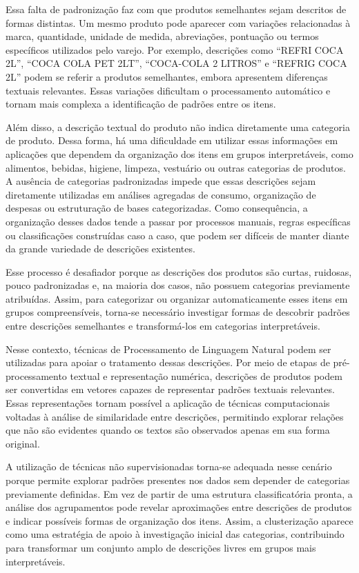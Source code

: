 \documentclass[english,brazilian]{UNISINOSmonografia}
\begin{document}
Essa falta de padronização faz com que produtos semelhantes sejam descritos de formas distintas. Um mesmo produto pode aparecer com variações relacionadas à marca, quantidade, unidade de medida, abreviações, pontuação ou termos específicos utilizados pelo varejo. Por exemplo, descrições como ``REFRI COCA 2L'', ``COCA COLA PET 2LT'', ``COCA-COLA 2 LITROS'' e ``REFRIG COCA 2L'' podem se referir a produtos semelhantes, embora apresentem diferenças textuais relevantes. Essas variações dificultam o processamento automático e tornam mais complexa a identificação de padrões entre os itens.

Além disso, a descrição textual do produto não indica diretamente uma categoria de produto. Dessa forma, há uma dificuldade em utilizar essas informações em aplicações que dependem da organização dos itens em grupos interpretáveis, como alimentos, bebidas, higiene, limpeza, vestuário ou outras categorias de produtos. A ausência de categorias padronizadas impede que essas descrições sejam diretamente utilizadas em análises agregadas de consumo, organização de despesas ou estruturação de bases categorizadas. Como consequência, a organização desses dados tende a passar por processos manuais, regras específicas ou classificações construídas caso a caso, que podem ser difíceis de manter diante da grande variedade de descrições existentes.

Esse processo é desafiador porque as descrições dos produtos são curtas, ruidosas, pouco padronizadas e, na maioria dos casos, não possuem categorias previamente atribuídas. Assim, para categorizar ou organizar automaticamente esses itens em grupos compreensíveis, torna-se necessário investigar formas de descobrir padrões entre descrições semelhantes e transformá-los em categorias interpretáveis.

Nesse contexto, técnicas de Processamento de Linguagem Natural podem ser utilizadas para apoiar o tratamento dessas descrições. Por meio de etapas de pré-processamento textual e representação numérica, descrições de produtos podem ser convertidas em vetores capazes de representar padrões textuais relevantes. Essas representações tornam possível a aplicação de técnicas computacionais voltadas à análise de similaridade entre descrições, permitindo explorar relações que não são evidentes quando os textos são observados apenas em sua forma original.

A utilização de técnicas não supervisionadas torna-se adequada nesse cenário porque permite explorar padrões presentes nos dados sem depender de categorias previamente definidas. Em vez de partir de uma estrutura classificatória pronta, a análise dos agrupamentos pode revelar aproximações entre descrições de produtos e indicar possíveis formas de organização dos itens. Assim, a clusterização aparece como uma estratégia de apoio à investigação inicial das categorias, contribuindo para transformar um conjunto amplo de descrições livres em grupos mais interpretáveis.
\end{document}
